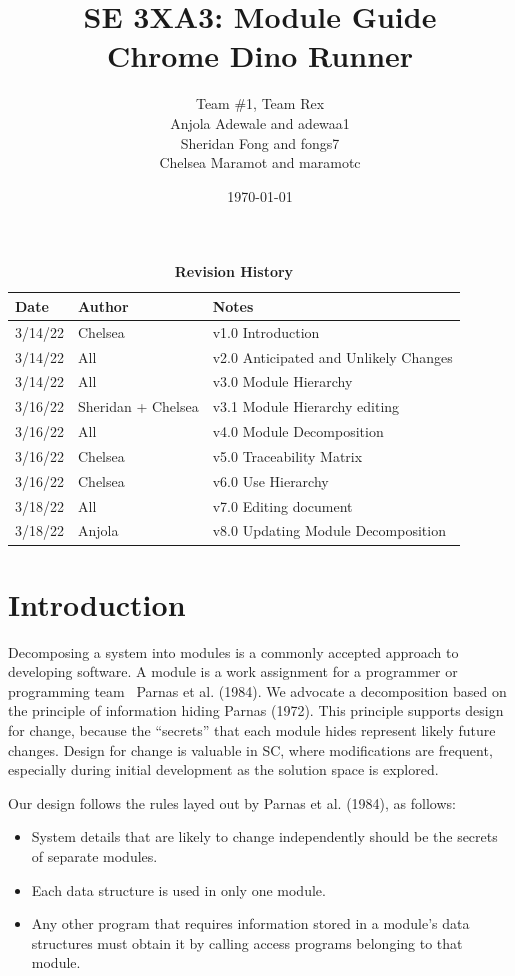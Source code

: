 \documentclass[12pt, titlepage]{article}
\title{SE 3XA3: Module Guide \\Chrome Dino Runner}
\author{Team \#1, Team Rex
		\\ Anjola Adewale and adewaa1
		\\ Sheridan Fong and fongs7
		\\ Chelsea Maramot and maramotc
}
\date{\today}
\begin{document}
\maketitle

\tableofcontents
\listoftables
\listoffigures

\begin{table}[H]
\caption{\bf Revision History}
\begin{tabularx}{\textwidth}{p{3cm}p{2cm}X}
\toprule {\bf Date} & {\bf Author} & {\bf Notes}\\
\midrule
3/14/22 & Chelsea & v1.0 Introduction \\

3/14/22 & All & v2.0 Anticipated and Unlikely Changes \\
3/14/22 & All & v3.0 Module Hierarchy \\
3/16/22 & Sheridan + Chelsea & v3.1 Module Hierarchy editing \\
3/16/22 & All & v4.0 Module Decomposition \\
3/16/22 & Chelsea & v5.0 Traceability Matrix \\
3/16/22 & Chelsea & v6.0 Use Hierarchy \\
3/18/22 & All & v7.0 Editing document \\
3/18/22 & Anjola & v8.0 Updating Module Decomposition \\
\bottomrule
\end{tabularx}
\end{table}

\newpage


\section{Introduction}

Decomposing a system into modules is a commonly accepted approach to developing
software.  A module is a work assignment for a programmer or programming
team~ Parnas et al. (1984).  We advocate a decomposition
based on the principle of information hiding Parnas (1972).  This
principle supports design for change, because the ``secrets'' that each module
hides represent likely future changes.  Design for change is valuable in SC,
where modifications are frequent, especially during initial development as the
solution space is explored.  

Our design follows the rules layed out by Parnas et al. (1984), as follows:
\begin{itemize}
\item System details that are likely to change independently should be the
  secrets of separate modules.
\item Each data structure is used in only one module.
\item Any other program that requires information stored in a module's data
  structures must obtain it by calling access programs belonging to that module.
\end{itemize}
\end{document}
